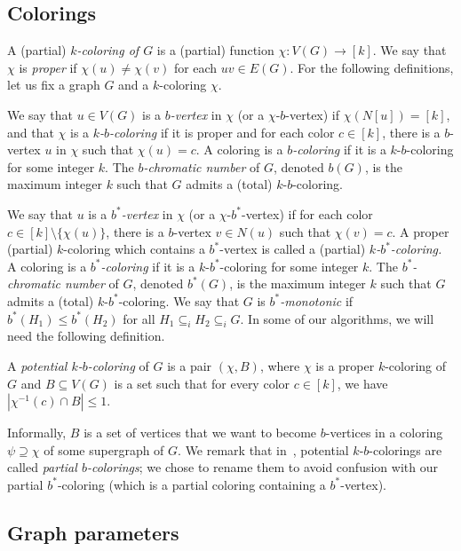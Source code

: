 \documentclass[runningheads, envcountsame]{llncs}
\newcommand{\seq}{\subseteq}
\begin{document}
\subsection{Colorings}
A (partial) \emph{$k$-coloring of $G$} is a (partial) function $\chi\colon V(G)\rightarrow [k]$.
We say that $\chi$ is \emph{proper} if $\chi(u)\ne\chi(v)$ for each $uv\in E(G)$.
For the following definitions, let us fix a graph $G$ and a $k$-coloring $\chi$.

We say that $u\in V(G)$ is a \emph{$b$-vertex} in $\chi$ (or a $\chi$-$b$-vertex) if $\chi(N[u]) = [k]$, and that $\chi$ is a \emph{$k$-$b$-coloring} if it is proper and for each color $c \in [k]$, there is a $b$-vertex $u$ in $\chi$ such that $\chi(u) = c$.
A coloring is a \emph{$b$-coloring} if it is a $k$-$b$-coloring for some integer $k$.
The \emph{$b$-chromatic number} of $G$, denoted $b(G)$, is the maximum integer $k$ such that $G$ admits a (total) $k$-$b$-coloring.

We say that $u$ is a \emph{$b^*$-vertex} in $\chi$ (or a $\chi$-$b^*$-vertex) if for each color $c \in [k]\setminus \{\chi(u)\}$, there is a $b$-vertex $v \in N(u)$ such that $\chi(v) = c$.
A proper (partial) $k$-coloring which contains a $b^*$-vertex is called a (partial) \emph{$k$-$b^*$-coloring.}
A coloring is a \emph{$b^*$-coloring} if it is a $k$-$b^*$-coloring for some integer $k$.
The \emph{$b^*$-chromatic number} of $G$, denoted $b^*(G)$, is the maximum integer $k$ such that $G$ admits a (total) $k$-$b^*$-coloring.
We say that $G$ is \emph{$b^*$-monotonic} if $b^*(H_1) \le b^*(H_2)$ for all $H_1 \seq_i H_2 \seq_i G$.
In some of our algorithms, we will need the following definition.

\begin{definition}
A \emph{potential $k$-$b$-coloring} of $G$ is a pair $(\chi, B)$, where $\chi$ is a proper $k$-coloring of $G$ and $B \seq V(G)$ is a set such that for every color $c \in [k]$, we have $|\chi^{-1}(c) \cap B| \le 1$.
\end{definition}

Informally, $B$ is a set of vertices that we want to become $b$-vertices in a coloring $\psi \supseteq \chi$ of some supergraph of $G$.
We remark that in~\cite{JaffkeLL24}, potential $k$-$b$-colorings are called \emph{partial $b$-colorings}; we chose to rename them to avoid confusion with our partial $b^*$-coloring (which is a partial coloring containing a $b^*$-vertex).


\subsection{Graph parameters}\label{sub:gp}
\end{document}
